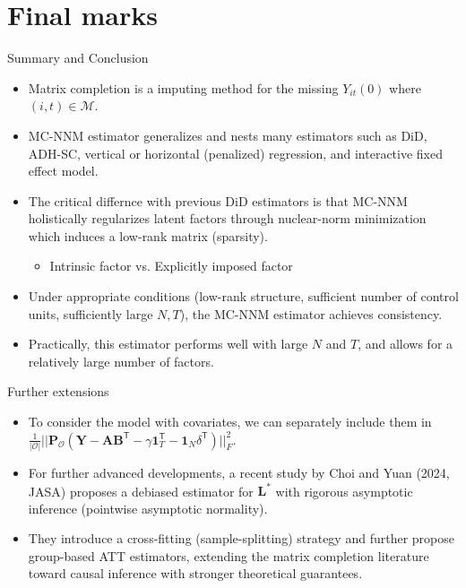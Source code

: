 \documentclass[xcolor=svgnames,aspectratio=169]{beamer}
\begin{document}
\section{Final marks}

\begin{frame}{Summary and Conclusion}
    \begin{itemize}
        \item Matrix completion is a imputing method for the missing $Y_{it}(0)$ where $(i,t)\in \mathcal{M}$.
        \item MC-NNM estimator generalizes and nests many estimators such as DiD, ADH-SC, vertical or horizontal (penalized) regression, and interactive fixed effect model.
        \item The critical differnce with previous DiD estimators is that MC-NNM \alert{holistically regularizes} latent factors through nuclear-norm minimization which induces a low-rank matrix (sparsity).
        \begin{itemize}
            \item Intrinsic factor vs. Explicitly imposed factor
        \end{itemize}
        \item Under appropriate conditions (low-rank structure, sufficient number of control units, sufficiently large $N,T$), the MC-NNM estimator achieves \alert{consistency}. 
        \item Practically, this estimator performs well with large $N$ and $T$, and allows for a relatively large number of factors.
    \end{itemize}
\end{frame}

\begin{frame}{Further extensions}
    \begin{itemize}
        \item To consider the model with covariates, we can separately include them in $\frac{1}{|\mathcal{O} |} ||\mathbf{P_{\mathcal{O} }}({\mathbf{Y}-\mathbf{AB}^{\mathsf{T}}-\gamma}\mathbf{1}_T^{\mathsf{T}}-\mathbf{1}_N\delta^{\mathsf{T}})||_F^2$.
        \item For further advanced developments, a recent study by Choi and Yuan (2024, JASA) proposes a debiased estimator for $\mathbf{L^*}$ with rigorous asymptotic inference (pointwise asymptotic normality). 
        \item They introduce a \alert{cross-fitting} (sample-splitting) strategy and further propose group-based ATT estimators, extending the matrix completion literature toward causal inference with stronger theoretical guarantees.
    \end{itemize}
\end{frame}
\end{document}

